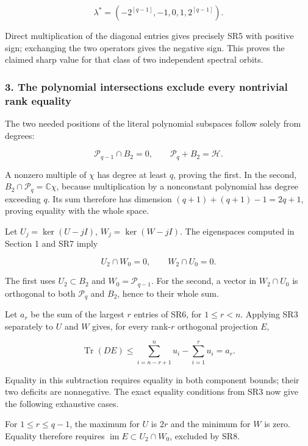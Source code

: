 \documentclass{article}
\begin{document}
\[
\lambda^*=(-2^{[q-1]},-1,0,1,2^{[q-1]}).
\tag{SR6}
\]

Direct multiplication of the diagonal entries gives precisely SR5 with positive sign; exchanging the two operators gives the negative sign. This proves the claimed sharp value for that class of two independent spectral orbits.

\subsubsection{3. The polynomial intersections exclude every nontrivial rank equality}\label{endpoint-four_window_sharpness_review--the-polynomial-intersections-exclude-every-nontrivial-rank-equality}

The two needed positions of the literal polynomial subspaces follow solely from degrees:

\[
\mathcal P_{q-1}\cap B_2=0,\qquad
\mathcal P_q+B_2=\mathcal H.
\tag{SR7}
\]

A nonzero multiple of \(\chi\) has degree at least \(q\), proving the first. In the second, \(B_2\cap\mathcal P_q=\mathbb C\chi\), because multiplication by a nonconstant polynomial has degree exceeding \(q\). Its sum therefore has dimension \((q+1)+(q+1)-1=2q+1\), proving equality with the whole space.

Let \(U_j=\ker(U-jI)\), \(W_j=\ker(W-jI)\). The eigenspaces computed in Section 1 and SR7 imply

\[
U_2\cap W_0=0,\qquad W_2\cap U_0=0.
\tag{SR8}
\]

The first uses \(U_2\subset B_2\) and \(W_0=\mathcal P_{q-1}\). For the second, a vector in \(W_2\cap U_0\) is orthogonal to both \(\mathcal P_q\) and \(B_2\), hence to their whole sum.

Let \(a_r\) be the sum of the largest \(r\) entries of SR6, for \(1\le r<n\). Applying SR3 separately to \(U\) and \(W\) gives, for every rank-\(r\) orthogonal projection \(E\),

\[
\operatorname{Tr}(DE)\le
\sum_{i=n-r+1}^{n}u_i-\sum_{i=1}^{r}u_i=a_r.
\tag{SR9}
\]

Equality in this subtraction requires equality in both component bounds; their two deficits are nonnegative. The exact equality conditions from SR3 now give the following exhaustive cases.

For \(1\le r\le q-1\), the maximum for \(U\) is \(2r\) and the minimum for \(W\) is zero. Equality therefore requires \(\operatorname{im}E\subset U_2\cap W_0\), excluded by SR8.
\end{document}
